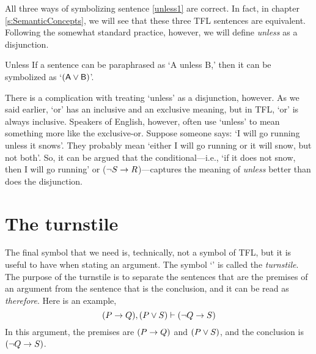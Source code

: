 All three ways of symbolizing sentence \ref{unless1} are correct. In fact, in chapter \ref{s:SemanticConcepts}, we will see that these three TFL sentences are equivalent. Following the somewhat standard practice, however, we will define \textit{unless} as a disjunction.
	
\begin{factboxy}{Unless}
If a sentence can be paraphrased as `A unless B,' then it can be symbolized as `$(\mathsf{A}\vee\mathsf{B})$'.
\end{factboxy}

There is a complication with treating `unless' as a disjunction, however. As we said earlier, `or' has an inclusive and an exclusive meaning, but in TFL, `or' is always inclusive. Speakers of English, however, often use `unless' to mean something more like the exclusive-or. Suppose someone says: `I will go running unless it snows'. They probably mean `either I will go running or it will snow, but not both'. So, it can be argued that the conditional---i.e., `if it does not snow, then I will go running' or (${\neg} S \rightarrow R$)---captures the meaning of \textit{unless} better than does the disjunction.


\section{The turnstile}

The final symbol that we need is, technically, not a symbol of TFL, but it is useful to have when stating an argument. The symbol `\proves' is called the \textit{turnstile}. The purpose of the turnstile is to separate the sentences that are the premises of an argument from the sentence that is the conclusion, and it can be read as \textit{therefore}. Here is an example,
$$(P \rightarrow Q), (P \vee S) \vdash ({\neg} Q \rightarrow S)$$
In this argument, the premises are $(P \rightarrow Q)$ and $(P \vee S)$, and the conclusion is $({\neg} Q \rightarrow S)$.







